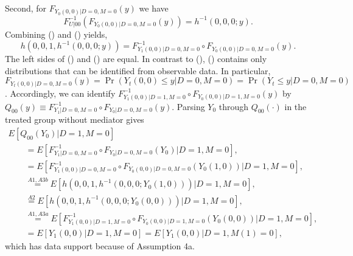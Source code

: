 \documentclass[a4paper,12pt]{article}
\begin{document}
 \doublespacing \pagestyle{plain}
Second, for $F_{Y_0(0,0)|D=0,M=0}(y)$ we have
\begin{equation} 
F_{U|00}^{-1} ( F_{Y_0(0,0)|D=0,M=0}(y)) =   h^{-1}(0,0,0;y).
\end{equation}
Combining () and () yields,
\begin{equation} 
h(0,0,1,h^{-1}(0,0,0;y))  =F_{Y_1(0,0)|D=0,M=0}^{-1} \circ F_{Y_0(0,0)|D=0,M=0}(y) .
\end{equation}
The left sides of () and () are equal. In contrast to (), () contains only distributions that can be identified from observable data. In particular, $F_{Y_t(0,0)|D=0,M=0}(y)  =\Pr(Y_t(0,0) \leq y|D=0,M=0) =  \Pr(Y_t \leq y|D=0,M=0)$. Accordingly, we can identify $F_{Y_1(0,0)|D=1,M=0}^{-1} \circ F_{Y_0(0,0)|D=1,M=0}(y)$ by $Q_{00} (y) \equiv F_{Y_1|D=0,M=0}^{-1} \circ F_{Y_0|D=0,M=0}(y) $.
Parsing $Y_0$ through $Q_{00}(\cdot)$ in the treated group without mediator gives
\begin{equation} \begin{array}{rl}
 E[Q_{00}(Y_0)|D=1,M=0] \\ \qquad =  E[F_{Y_1|D=0,M=0}^{-1} \circ F_{Y_0|D=0,M=0}(Y_0 )|D=1,M=0], \\
 \qquad =  E[F_{Y_1(0,0)|D=0,M=0}^{-1} \circ F_{Y_0(0,0)|D=0,M=0}(Y_0(1,0))|D=1,M=0], \\
\qquad \stackrel{A1,A3b}{=}  E[h(0,0,1,h^{-1}(0,0,0; Y_0(1,0)))|D=1,M=0], \\
\qquad \stackrel{A2}{=} E[h(0,0,1,h^{-1}(0,0,0; Y_0(0,0)))|D=1,M=0], \\
\qquad \stackrel{A1,A3a}{=}E[F_{Y_1(0,0)|D=1,M=0}^{-1} \circ F_{Y_0(0,0)|D=1,M=0}(Y_0 (0,0))|D=1,M=0],\\
\qquad =E[Y_1(0,0)|D=1,M=0]=E[Y_1(0,0)|D=1,M(1)=0], \end{array}
\end{equation}
which has data support because of Assumption 4a.
\end{document}
